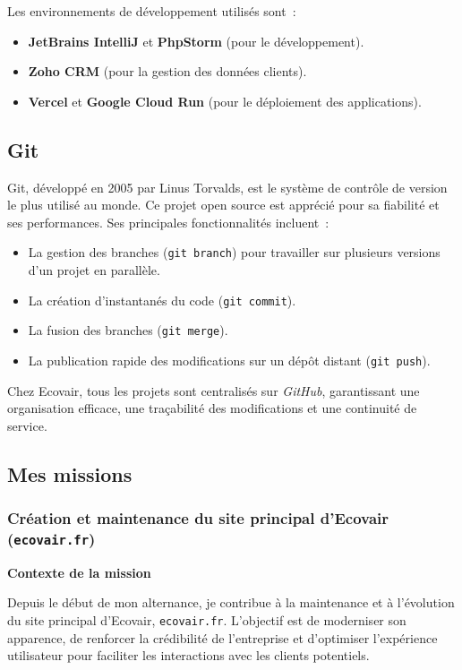 Les environnements de développement utilisés sont~:

\begin{itemize}
    \item \textbf{JetBrains IntelliJ} et \textbf{PhpStorm} (pour le développement).
    \item \textbf{Zoho CRM} (pour la gestion des données clients).
    \item \textbf{Vercel} et \textbf{Google Cloud Run} (pour le déploiement des applications).
\end{itemize}

\subsection{Git}

Git, développé en 2005 par Linus Torvalds, est le système de contrôle de version le plus utilisé au monde. Ce projet open source est apprécié pour sa fiabilité et ses performances. Ses principales fonctionnalités incluent~:

\begin{itemize}
    \item La gestion des branches (\texttt{git branch}) pour travailler sur plusieurs versions d’un projet en parallèle.
    \item La création d’instantanés du code (\texttt{git commit}).
    \item La fusion des branches (\texttt{git merge}).
    \item La publication rapide des modifications sur un dépôt distant (\texttt{git push}).
\end{itemize}

Chez Ecovair, tous les projets sont centralisés sur \textit{GitHub}, garantissant une organisation efficace, une traçabilité des modifications et une continuité de service.

\subsection{Mes missions}

\subsubsection{Création et maintenance du site principal d’Ecovair (\texttt{ecovair.fr})}

\textbf{Contexte de la mission}

Depuis le début de mon alternance, je contribue à la maintenance et à l’évolution du site principal d’Ecovair, \texttt{ecovair.fr}. L’objectif est de moderniser son apparence, de renforcer la crédibilité de l’entreprise et d’optimiser l’expérience utilisateur pour faciliter les interactions avec les clients potentiels.

